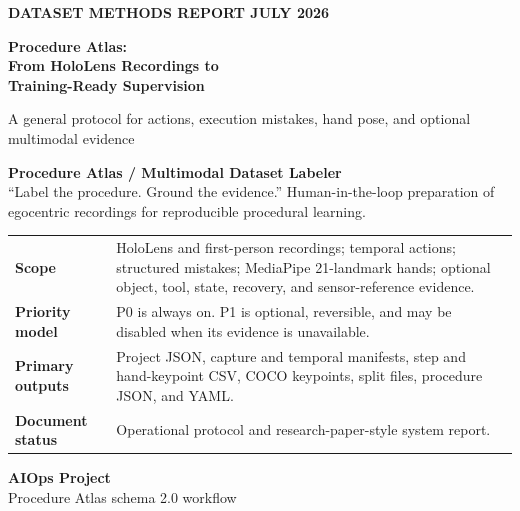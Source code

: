 \documentclass[10pt]{article}
\begin{document}
\begin{titlepage}
\pagecolor{paper}
\vspace*{0.9cm}
{\small\bfseries\color{orange}DATASET METHODS REPORT \hfill JULY 2026}
\vspace{1.25cm}

{\fontsize{29}{33}\selectfont\bfseries\color{ink}
Procedure Atlas:\\From HoloLens Recordings to\\Training-Ready Supervision\par}
\vspace{0.45cm}
{\Large\color{muted}A general protocol for actions, execution mistakes,
hand pose, and optional multimodal evidence\par}
\vspace{1.0cm}

\noindent\colorbox{ink}{\parbox{\dimexpr\textwidth-2\fboxsep\relax}{
\vspace{0.55em}\color{white}\large
\textbf{Procedure Atlas / Multimodal Dataset Labeler}\\[-1pt]
\small ``Label the procedure. Ground the evidence.'' Human-in-the-loop
preparation of egocentric recordings for reproducible procedural learning.
\vspace{0.55em}}}

\vfill
\begin{tabularx}{\textwidth}{@{}>{\bfseries\color{ink}}p{}Y@{}}
Scope & HoloLens and first-person recordings; temporal actions; structured
mistakes; MediaPipe 21-landmark hands; optional object, tool, state, recovery,
and sensor-reference evidence.\\
Priority model & P0 is always on. P1 is optional, reversible, and may be disabled
when its evidence is unavailable.\\
Primary outputs & Project JSON, capture and temporal manifests, step and
hand-keypoint CSV, COCO keypoints, split files, procedure JSON, and YAML.\\
Document status & Operational protocol and research-paper-style system report.\\
\end{tabularx}
\vspace{0.85cm}

{\large\bfseries\color{ink}AIOps Project}\\
{\small\color{muted}Procedure Atlas schema 2.0 workflow}
\end{titlepage}
\nopagecolor
\end{document}
